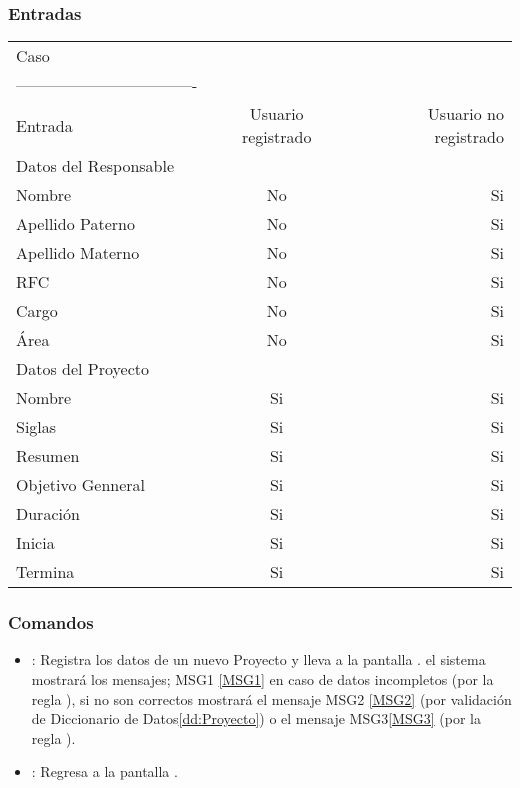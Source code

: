 \subsubsection{Entradas}
\begin{center}
   \begin{tabular}{| l | c | r | }
     \hline
       Caso &  &  \\
     ---------------------------------- &  & \\
     Entrada & Usuario registrado & Usuario no registrado \\ \hline
     Datos del Responsable &  &  \\
     Nombre & No & Si \\
     Apellido Paterno & No & Si \\
     Apellido Materno & No & Si \\
     RFC & No & Si \\
     Cargo & No & Si \\
     Área & No & Si \\ \hline
     Datos del Proyecto &  &  \\
     Nombre & Si & Si \\
     Siglas & Si & Si \\
     Resumen & Si & Si \\
     Objetivo Genneral & Si & Si \\
     Duración & Si & Si \\
     Inicia & Si & Si \\
     Termina & Si & Si \\
     \hline
   \end{tabular}
 \end{center}

\subsubsection{Comandos}
\begin{itemize}
 \item {}: Registra los datos de un nuevo Proyecto y lleva a la pantalla .  el sistema mostrará los mensajes; MSG1 \ref{MSG1} en caso de datos incompletos (por la regla ), si no son correctos mostrará el mensaje MSG2 \ref{MSG2} (por validación de Diccionario de Datos\ref{dd:Proyecto}) o el mensaje MSG3\ref{MSG3} (por la regla ).
 \item {}: Regresa a la pantalla .
\end{itemize}